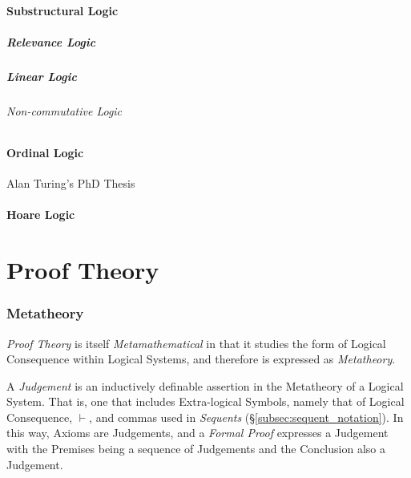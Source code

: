 \documentclass{article}
\begin{document}
\subsection{Substructural Logic}\label{subsec:substructural_logic}

\subsubsection{Relevance Logic}\label{subsec:relevance_logic}

\subsubsection{Linear Logic}\label{subsec:linear_logic}

\paragraph{Non-commutative Logic}\label{subsec:noncommutative_logic}

\subsection{Ordinal Logic}

Alan Turing's PhD Thesis \cite{turing38}

\subsection{Hoare Logic}

\part{Proof Theory}

\section{Metatheory} \label{sec:metatheory}

\emph{Proof Theory} is itself \emph{Metamathematical} in that it
studies the form of Logical Consequence within Logical Systems, and
therefore is expressed as \emph{Metatheory}.

A \emph{Judgement} is an inductively definable assertion in the
Metatheory of a Logical System. That is, one that includes
Extra-logical Symbols, namely that of Logical Consequence, $\vdash$,
and commas used in \emph{Sequents}
(\S\ref{subsec:sequent_notation}). In this way, Axioms are Judgements,
and a \emph{Formal Proof} expresses a Judgement with the Premises
being a sequence of Judgements and the Conclusion also a Judgement.
\end{document}
